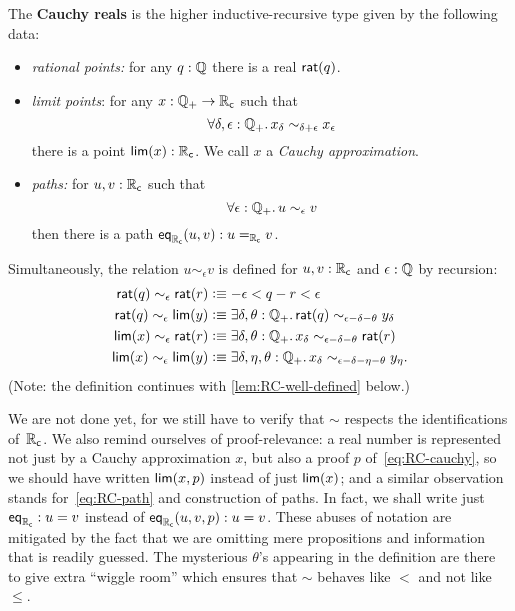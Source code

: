 \begin{defn}\label{defn:cauchy-reals}
  The \textbf{Cauchy reals \RC} is the higher inductive-recursive type given by the
  following data:
  \begin{itemize}
  \item \emph{rational points:} 
    for any $q : \Q$ there is a real $\rcrat(q)$.
  \item \emph{limit points}:
    for any $x : \Qp \to \RC$ such that
    \begin{equation}
      \label{eq:RC-cauchy}
      \fall{\delta, \epsilon : \Qp} x_\delta \sim_{\delta + \epsilon} x_\epsilon
    \end{equation}
    there is a point $\rclim(x) : \RC$. We call $x$ a \emph{Cauchy approximation}.
  \item \emph{paths:}
    for $u, v : \RC$ such that
    \begin{equation}
      \label{eq:RC-path}
      \fall{\epsilon : \Qp} u \sim_\epsilon v
    \end{equation}
    then there is a path $\rceq(u, v) : \id[\RC]{u}{v}$.
  \end{itemize}
  Simultaneously, the relation $u \sim_\epsilon v$ is defined for $u, v : \RC$ and
  $\epsilon : \Q$ by recursion:
  \begin{align*}
    \rcrat(q) \sim_\epsilon \rcrat(r)  &\defeq
    -\epsilon < q - r < \epsilon
    \\
    \rcrat(q) \sim_\epsilon \rclim(y) &\defeq
    \exis{\delta, \theta : \Qp} \rcrat(q) \sim_{\epsilon - \delta - \theta} y_\delta
    \\
    \rclim(x) \sim_\epsilon \rcrat(r) &\defeq
    \exis{\delta, \theta : \Qp} x_\delta \sim_{\epsilon - \delta - \theta} \rcrat(r)
    \\
    \rclim(x) \sim_\epsilon \rclim(y) &\defeq
    \exis{\delta, \eta, \theta : \Qp} x_\delta \sim_{\epsilon - \delta - \eta - \theta} y_\eta.
  \end{align*}  
  (Note: the definition continues with \autoref{lem:RC-well-defined} below.)
\end{defn}

We are not done yet, for we still have to verify that $\sim$ respects the identifications
of~$\RC$. We also remind ourselves of proof-relevance: a real number is represented not
just by a Cauchy approximation $x$, but also a proof $p$ of~\eqref{eq:RC-cauchy}, so we
should have written $\rclim(x,p)$ instead of just $\rclim(x)$; and a similar observation
stands for~\eqref{eq:RC-path} and construction of paths. In fact, we shall write just
$\rceq : u = v$ instead of $\rceq(u, v, p) : u = v$. These abuses of notation are
mitigated by the fact that we are omitting mere propositions and information that is
readily guessed. The mysterious $\theta$'s appearing in the definition are there to give
extra ``wiggle room'' which ensures that $\sim$ behaves like $<$ and not like $\leq$.

